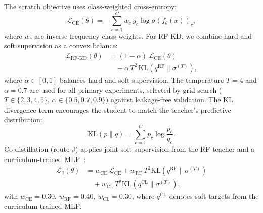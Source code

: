 \documentclass[journal]{IEEEtran}
\begin{document}
The scratch objective uses class-weighted cross-entropy:
\begin{equation}
\mathcal{L}_{\mathrm{CE}}(\theta) = -\sum_{c=1}^{C} w_c\, y_c \log \sigma(f_\theta(x))_c,
\end{equation}
where $w_c$ are inverse-frequency class weights.
For RF-KD, we combine hard and soft supervision as a convex balance:
\begin{equation}
\begin{split}
\mathcal{L}_{\mathrm{RF\text{-}KD}}(\theta) &= (1 - \alpha)\, \mathcal{L}_{\mathrm{CE}}(\theta) \\
&\quad + \alpha\, T^2\, \mathrm{KL}\!\left(q^{\mathrm{RF}} \| \sigma^{(T)}\right),
\end{split}
\end{equation}
where $\alpha \in [0, 1]$ balances hard and soft supervision.
The temperature $T=4$ and $\alpha=0.7$ are used for all primary experiments, selected by grid search ($T \in \{2, 3, 4, 5\}$, $\alpha \in \{0.5, 0.7, 0.9\}$) against leakage-free validation.
The KL divergence term encourages the student to match the teacher's predictive distribution:
\begin{equation}
\mathrm{KL}(p \| q) = \sum_{c=1}^{C} p_c \log \frac{p_c}{q_c}.
\end{equation}
Co-distillation (route J) applies joint soft supervision from the RF teacher and a curriculum-trained MLP~\cite{benaddi2025lightweight}:
{\begin{equation}
\begin{split}
\mathcal{L}_{\mathrm{J}}(\theta) &= w_{\mathrm{CE}}\, \mathcal{L}_{\mathrm{CE}} + w_{\mathrm{RF}}\, T^2 \mathrm{KL}(q^{\mathrm{RF}} \| \sigma^{(T)}) \\
&\quad + w_{\mathrm{CL}}\, T^2 \mathrm{KL}(q^{\mathrm{CL}} \| \sigma^{(T)}),
\end{split}
\end{equation}}
with $w_{\mathrm{CE}} = 0.30$, $w_{\mathrm{RF}} = 0.40$, $w_{\mathrm{CL}} = 0.30$, where $q^{\mathrm{CL}}$ denotes soft targets from the curriculum-trained MLP.
\end{document}
